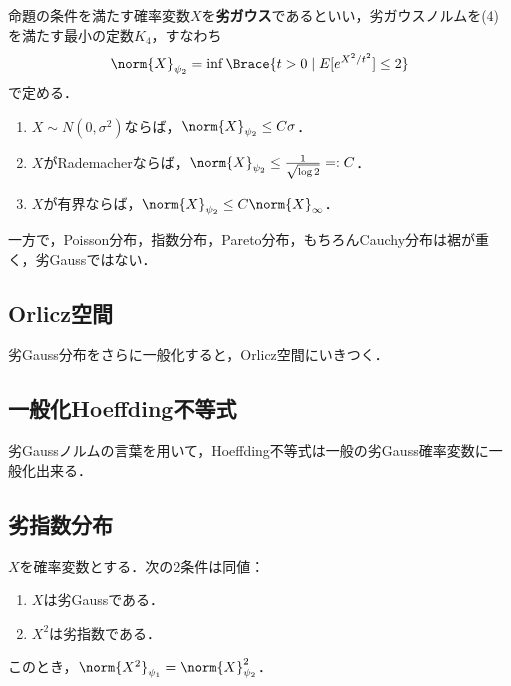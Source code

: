 \documentclass[uplatex,dvipdfmx]{jsreport}
\begin{document}
\begin{definition}
    命題の条件を満たす確率変数$X$を\textbf{劣ガウス}であるといい，劣ガウスノルムを(4)を満たす最小の定数$K_4$，すなわち
    \[\norm{X}_{\psi_2}=\inf\Brace{t>0\mid E[e^{X^2/t^2}]\le 2}\]
    で定める．
\end{definition}

\begin{example}\mbox{}
    \begin{enumerate}
        \item $X\sim N(0,\sigma^2)$ならば，$\norm{X}_{\psi_2}\le C\sigma$．
        \item $X$がRademacherならば，$\norm{X}_{\psi_2}\le\frac{1}{\sqrt{\log 2}}=:C$．
        \item $X$が有界ならば，$\norm{X}_{\psi_2}\le C\norm{X}_\infty$．
    \end{enumerate}
    一方で，Poisson分布，指数分布，Pareto分布，もちろんCauchy分布は裾が重く，劣Gaussではない．
\end{example}

\subsection{Orlicz空間}

\begin{tcolorbox}[colframe=ForestGreen, colback=ForestGreen!10!white,breakable,colbacktitle=ForestGreen!40!white,coltitle=black,fonttitle=\bfseries\sffamily,
title=]
    劣Gauss分布をさらに一般化すると，Orlicz空間にいきつく．
\end{tcolorbox}

\subsection{一般化Hoeffding不等式}

\begin{tcolorbox}[colframe=ForestGreen, colback=ForestGreen!10!white,breakable,colbacktitle=ForestGreen!40!white,coltitle=black,fonttitle=\bfseries\sffamily,
title=]
    劣Gaussノルムの言葉を用いて，Hoeffding不等式は一般の劣Gauss確率変数に一般化出来る．
\end{tcolorbox}

\subsection{劣指数分布}

\begin{lemma}
    $X$を確率変数とする．次の2条件は同値：
    \begin{enumerate}
        \item $X$は劣Gaussである．
        \item $X^2$は劣指数である．
    \end{enumerate}
    このとき，$\norm{X^2}_{\psi_1}=\norm{X}^2_{\psi_2}$．
\end{lemma}
\end{document}
